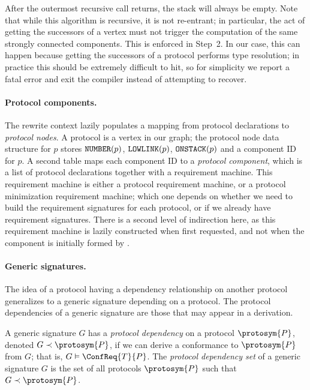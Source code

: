 \documentclass[../generics]{subfiles}
\begin{document}
After the outermost recursive call returns, the stack will always be empty. Note that while this algorithm is recursive, it is not re-entrant; in particular, the act of getting the successors of a vertex must not trigger the computation of the same strongly connected components. This is enforced in Step~2. In our case, this can happen because getting the successors of a protocol performs type resolution; in practice this should be extremely difficult to hit, so for simplicity we report a fatal error and exit the compiler instead of attempting to recover.

\paragraph{Protocol components.} The rewrite context lazily populates a mapping from protocol declarations to \emph{protocol nodes}. A protocol is a vertex in our graph; the protocol node data structure for $p$ stores $\texttt{NUMBER}(p)$, $\texttt{LOWLINK}(p)$, $\texttt{ONSTACK}(p)$ and a component ID for $p$. A second table maps each component ID to a \emph{protocol component}, which is a list of protocol declarations together with a requirement machine. This requirement machine is either a protocol requirement machine, or a protocol minimization requirement machine; which one depends on whether we need to build the requirement signatures for each protocol, or if we already have requirement signatures. There is a second level of indirection here, as this requirement machine is lazily constructed when first requested, and not when the component is initially formed by .

\paragraph{Generic signatures.}
The idea of a protocol having a dependency relationship on another protocol generalizes to a generic signature depending on a protocol. The protocol dependencies of a generic signature are those that may appear in a derivation.

\begin{definition}
A generic signature $G$ has a \emph{protocol dependency} on a protocol $\protosym{P}$, denoted \index{$\prec$}$G\prec\protosym{P}$, if we can derive a conformance to $\protosym{P}$ from $G$; that is, $G\vDash\ConfReq{T}{P}$. The \emph{protocol dependency set} of a generic signature $G$ is the set of all protocols $\protosym{P}$ such that $G\prec\protosym{P}$.

\end{definition}
\end{document}
